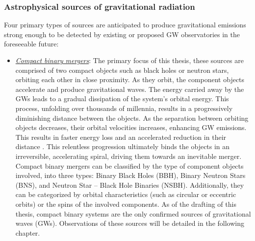 \subsubsection{Astrophysical sources of gravitational radiation}
Four primary types of sources are anticipated to produce gravitational emissions strong enough to be detected by existing or proposed GW observatories in the foreseeable future:  
\begin{itemize}
\item \underline{\textit{Compact binary mergers}}: The primary focus of this thesis, these sources are comprised of two compact objects such as black holes or neutron stars, orbiting each other in close proximity. As they orbit, the component objects accelerate and produce gravitational waves. The energy carried away by the GWs leads to a gradual dissipation of the system's orbital energy. This process, unfolding over thousands of millennia, results in a progressively diminishing distance between the objects. As the separation between orbiting objects decreases, their orbital velocities increases, enhancing GW emissions. This results in faster energy loss and an accelerated reduction in their distance \cite{Peters:1963ux,Peters:1964zz}. This relentless progression ultimately binds the objects in an irreversible, accelerating spiral, driving them towards an inevitable merger. Compact binary mergers can be classified by the type of component objects involved, into three types: Binary Black Holes (BBH), Binary Neutron Stars (BNS), and Neutron Star – Black Hole Binaries (NSBH). Additionally, they can be categorized by orbital characteristics (such as circular or eccentric orbits) or the spins of the involved components. As of the drafting of this thesis, compact binary systems are the only confirmed sources of gravitational waves (GWs). Observations of these sources will be detailed in the following chapter.




\end{itemize}
